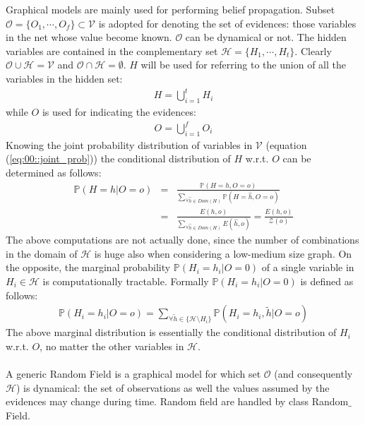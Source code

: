 Graphical models are mainly used for performing belief propagation. Subset $\mathcal{O}=\lbrace O_1 , \cdots, O_f \rbrace \subset \mathcal{V}$ is adopted for denoting the set of evidences: those variables in the net whose value become known. $\mathcal{O}$  can be dynamical or not. The hidden variables are contained in the complementary set $\mathcal{H}=\lbrace H_1 , \cdots, H_t \rbrace$. Clearly $\mathcal{O} \cup \mathcal{H} = \mathcal{V}$ and $ \mathcal{O} \cap \mathcal{H} = \emptyset$.  
$H$ will be used for referring to the union of all the variables in the hidden set:
\begin{eqnarray}
H = \bigcup_{i=1}^{t} H_i
\end{eqnarray}
while $O$ is used for indicating the evidences:
\begin{eqnarray}
O = \bigcup_{i=1}^{f} O_i
\end{eqnarray}
Knowing the joint probability distribution of variables in $\mathcal{V}$ (equation (\ref{eq:00::joint_prob})) the conditional distribution of $H$ w.r.t. 
$O$ can be determined as follows:
\begin{eqnarray}
\mathbb{P}(H=h | O=o) &=& \frac{ \mathbb{P}(H=h , O=o) }{  \sum _{\forall \hat{h} \in Dom(H) } \mathbb{P}(H=\hat{h} , O=o)} \nonumber\\
					  &=& \frac{ E(h,o) }{ \sum _{\forall \hat{h} \in Dom(H)} E(\hat{h}, o) } = \frac{ E(h,o)}{ \mathcal{Z}(o)}
					  \label{eq:00:cond_prob}
\end{eqnarray}
The above computations are not actually done, since the number of combinations in the domain of  $\mathcal{H}$ is huge also when considering a low-medium size graph.
On the opposite, the marginal probability $\mathbb{P}(H_i = h_i | O = 0)$ of a single variable in $H_i \in \mathcal{H}$ is computationally tractable.
Formally $\mathbb{P}(H_i = h_i | O = 0)$ is defined as follows:
\begin{eqnarray}
\mathbb{P}(H_i = h_i | O = o) = \sum _{\forall \tilde{h} \in \lbrace \mathcal{H} \setminus H_i \rbrace} \mathbb{P}(H_i = h_i, \tilde{h} | O = o )
\end{eqnarray}
The above marginal distribution is essentially the conditional distribution of $H_i$ w.r.t. $O$, no matter the other variables in $\mathcal{H}$. 
\\
\\
A generic Random Field is a graphical model for which set $\mathcal{O}$ (and consequently $\mathcal{H}$) is dynamical: the set of observations as well the values assumed by the evidences may change during time. Random field are handled by class Random$\_$Field.
